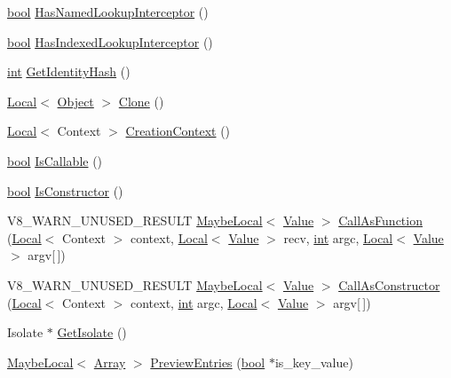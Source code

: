 \begin{DoxyCompactItemize}
\item 
\mbox{\hyperlink{classbool}{bool}} \mbox{\hyperlink{classv8_1_1Object_a1e96fcb9ee17101c0299ec68f2cf8610}{Has\+Named\+Lookup\+Interceptor}} ()
\item 
\mbox{\hyperlink{classbool}{bool}} \mbox{\hyperlink{classv8_1_1Object_a278913bcd203434870ce5184a538a9af}{Has\+Indexed\+Lookup\+Interceptor}} ()
\item 
\mbox{\hyperlink{classint}{int}} \mbox{\hyperlink{classv8_1_1Object_ac1ece41e81a499920ec3a2a3471653bc}{Get\+Identity\+Hash}} ()
\item 
\mbox{\hyperlink{classv8_1_1Local}{Local}}$<$ \mbox{\hyperlink{classv8_1_1Object}{Object}} $>$ \mbox{\hyperlink{classv8_1_1Object_a68b17d2eada7c18c1fdb5e2f104c7766}{Clone}} ()
\item 
\mbox{\hyperlink{classv8_1_1Local}{Local}}$<$ Context $>$ \mbox{\hyperlink{classv8_1_1Object_ac8c025cd67f4820a840789235bdde6cb}{Creation\+Context}} ()
\item 
\mbox{\hyperlink{classbool}{bool}} \mbox{\hyperlink{classv8_1_1Object_a23c2c1f23b50fab4a02e2f819641b865}{Is\+Callable}} ()
\item 
\mbox{\hyperlink{classbool}{bool}} \mbox{\hyperlink{classv8_1_1Object_a257233cb6b11dc7bb5a0e8df8695e889}{Is\+Constructor}} ()
\item 
V8\+\_\+\+W\+A\+R\+N\+\_\+\+U\+N\+U\+S\+E\+D\+\_\+\+R\+E\+S\+U\+LT \mbox{\hyperlink{classv8_1_1MaybeLocal}{Maybe\+Local}}$<$ \mbox{\hyperlink{classv8_1_1Value}{Value}} $>$ \mbox{\hyperlink{classv8_1_1Object_a36ee3ee43ef630b0348d11f63e717d9a}{Call\+As\+Function}} (\mbox{\hyperlink{classv8_1_1Local}{Local}}$<$ Context $>$ context, \mbox{\hyperlink{classv8_1_1Local}{Local}}$<$ \mbox{\hyperlink{classv8_1_1Value}{Value}} $>$ recv, \mbox{\hyperlink{classint}{int}} argc, \mbox{\hyperlink{classv8_1_1Local}{Local}}$<$ \mbox{\hyperlink{classv8_1_1Value}{Value}} $>$ argv\mbox{[}$\,$\mbox{]})
\item 
V8\+\_\+\+W\+A\+R\+N\+\_\+\+U\+N\+U\+S\+E\+D\+\_\+\+R\+E\+S\+U\+LT \mbox{\hyperlink{classv8_1_1MaybeLocal}{Maybe\+Local}}$<$ \mbox{\hyperlink{classv8_1_1Value}{Value}} $>$ \mbox{\hyperlink{classv8_1_1Object_a64254f08a94bf19c91513875e9dc80e7}{Call\+As\+Constructor}} (\mbox{\hyperlink{classv8_1_1Local}{Local}}$<$ Context $>$ context, \mbox{\hyperlink{classint}{int}} argc, \mbox{\hyperlink{classv8_1_1Local}{Local}}$<$ \mbox{\hyperlink{classv8_1_1Value}{Value}} $>$ argv\mbox{[}$\,$\mbox{]})
\item 
Isolate $\ast$ \mbox{\hyperlink{classv8_1_1Object_a8e099f87dfb226badc5063f716790b4d}{Get\+Isolate}} ()
\item 
\mbox{\hyperlink{classv8_1_1MaybeLocal}{Maybe\+Local}}$<$ \mbox{\hyperlink{classv8_1_1Array}{Array}} $>$ \mbox{\hyperlink{classv8_1_1Object_a8ed690cfca5d1cc2667b334f8122f6d2}{Preview\+Entries}} (\mbox{\hyperlink{classbool}{bool}} $\ast$is\+\_\+key\+\_\+value)
\end{DoxyCompactItemize}
